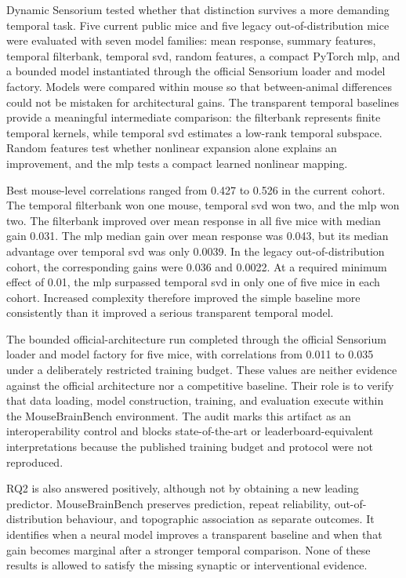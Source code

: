 \documentclass[a4paper,fleqn]{cas-sc}
\begin{document}
Dynamic Sensorium tested whether that distinction survives a more demanding
temporal task. Five current public mice and five legacy out-of-distribution mice
were evaluated with seven model families: mean response, summary features,
temporal filterbank, temporal \ac{svd}, random features, a compact PyTorch
\ac{mlp}, and a bounded model
instantiated through the official Sensorium loader and model factory. Models
were compared within mouse so that between-animal differences could not be
mistaken for architectural gains. The transparent temporal baselines provide a
meaningful intermediate comparison: the filterbank represents finite temporal
kernels, while temporal \acs{svd} estimates a low-rank temporal subspace. Random
features test whether nonlinear expansion alone explains an improvement, and
the \acs{mlp} tests a compact learned nonlinear mapping.

Best mouse-level correlations ranged from 0.427 to 0.526 in the current cohort.
The temporal filterbank won one mouse, temporal \acs{svd} won two, and the \acs{mlp} won
two. The filterbank improved over mean response in all five mice with median
gain 0.031. The \acs{mlp} median gain over mean response was 0.043, but its median
advantage over temporal \acs{svd} was only 0.0039. In the legacy out-of-distribution
cohort, the corresponding gains were 0.036 and 0.0022. At a required minimum
effect of 0.01, the \acs{mlp} surpassed temporal \acs{svd} in only one of five mice in each
cohort. Increased complexity therefore improved the simple baseline more
consistently than it improved a serious transparent temporal model.

The bounded official-architecture run completed through the official Sensorium
loader and model factory for five mice, with correlations from 0.011 to 0.035
under a deliberately restricted training budget. These values are neither
evidence against the official architecture nor a competitive baseline. Their
role is to verify that data loading, model construction, training, and
evaluation execute within the MouseBrainBench environment. The audit marks this
artifact as an interoperability control and blocks state-of-the-art or
leaderboard-equivalent interpretations because the published training budget
and protocol were not reproduced.

RQ2 is also answered positively, although not by obtaining a new leading
predictor. MouseBrainBench preserves prediction, repeat reliability,
out-of-distribution behaviour, and topographic association as separate outcomes.
It identifies when a neural model improves a transparent baseline and when that
gain becomes marginal after a stronger temporal comparison. None of these
results is allowed to satisfy the missing synaptic or interventional evidence.
\end{document}
